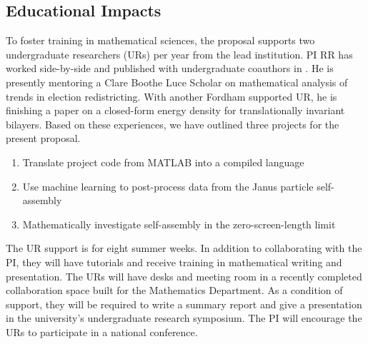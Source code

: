 \subsection{Educational Impacts}
\label{subsec:Educational_plans}
To foster training in mathematical sciences,
the proposal supports two undergraduate researchers (URs) per year
from the lead institution.
PI RR has worked side-by-side and
published with undergraduate coauthors in
\cite{RYHAM20112929, RyWaCo13, RyKlYaCo16}.
He is presently mentoring a Clare Boothe Luce Scholar 
on mathematical analysis of trends in election redistricting.
With another Fordham supported UR,
he is finishing a paper on a closed-form 
energy density for translationally invariant bilayers. 
Based on these experiences, we have outlined three projects for the present proposal.
\begin{enumerate}[noitemsep,topsep=0pt]
\item Translate project code from MATLAB into a compiled language   

\item Use machine learning to post-process data from the Janus particle self-assembly

\item Mathematically investigate self-assembly in the zero-screen-length limit

  
\end{enumerate}
The UR support is for eight summer weeks. 
In addition to collaborating with the PI,
they will have tutorials and receive training in
mathematical writing and presentation.
The URs will have desks and meeting room
in a recently completed collaboration space
built for the Mathematics Department. 
As a condition of support, 
they will be required to write a summary report and
give a presentation in the university's undergraduate
research symposium.  The PI 
will encourage the
URs to participate in a national conference.

